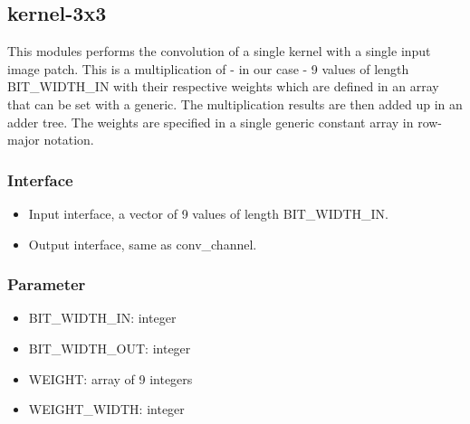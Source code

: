 \subsection{kernel-3x3}

This modules performs the convolution of a single kernel with a single input image patch. This is a multiplication of - in our case - 9 values of length BIT\_WIDTH\_IN with their respective weights which are defined in an array that can be set with a generic. The multiplication results are then added up in an adder tree. The weights are specified in a single generic constant array in row-major notation.

\subsubsection{Interface}
\begin{itemize}
	\item Input interface, a vector of 9 values of length BIT\_WIDTH\_IN.
	\item Output interface, same as conv\_channel.
\end{itemize}

\subsubsection{Parameter}
\begin{itemize}
	\item BIT\_WIDTH\_IN: integer
	\item BIT\_WIDTH\_OUT: integer
	\item WEIGHT: array of 9 integers
	\item WEIGHT\_WIDTH: integer
\end{itemize}